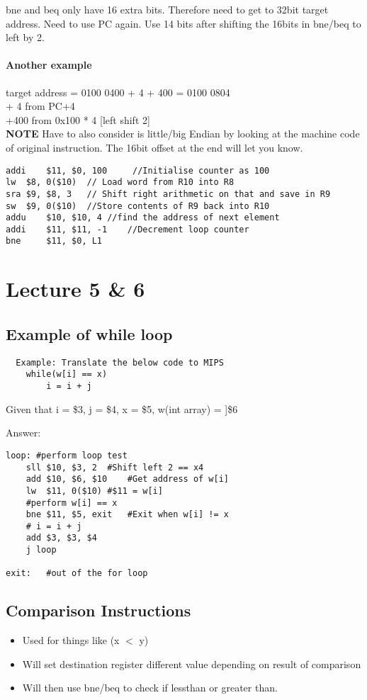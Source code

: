 \documentclass{article}
\begin{document}
	bne and beq only have 16 extra bits. Therefore need to get to 32bit target address. Need to use PC again. Use 14 bits after shifting the 16bits in bne/beq to left by 2.

	\paragraph{Another example}
	target address = 0100 0400 + 4  + 400 = 0100 0804 \\
	+ 4 from PC+4 \\
	+400 from 0x100 * 4 [left shift 2] \\
	\textbf{NOTE} Have to also consider is little/big Endian by looking at the machine code of original instruction. The 16bit offset at the end will let you know.

	\begin{lstlisting}
addi 	$11, $0, 100	 //Initialise counter as 100
lw 	$8, 0($10)	// Load word from R10 into R8
sra	$9, $8, 3	// Shift right arithmetic on that and save in R9
sw 	$9, 0($10)	//Store contents of R9 back into R10
addu 	$10, $10, 4	//find the address of next element
addi 	$11, $11, -1	//Decrement loop counter
bne 	$11, $0, L1
	\end{lstlisting}

\section*{Lecture 5 \& 6}
	\subsection*{Example of while loop}
	\begin{lstlisting}
  Example: Translate the below code to MIPS
	while(w[i] == x)
		i = i + j
	\end{lstlisting}

	Given that i = \$3, j = \$4, x = \$5, w(int array) = ]\$6

	Answer:
	\begin{lstlisting}
loop: #perform loop test
	sll	$10, $3, 2	#Shift left 2 == x4
	add $10, $6, $10	#Get address of w[i]
	lw	$11, 0($10)	#$11 = w[i]
	#perform w[i] == x
	bne $11, $5, exit	#Exit when w[i] != x
	# i = i + j
	add $3, $3, $4
	j loop

exit:	#out of the for loop
	\end{lstlisting}

	\subsection*{Comparison Instructions}
	\begin{itemize}
		\item Used for things like (x $<$ y)
		\item Will set destination register different value depending on result of comparison
		\item Will then use bne/beq to check if lessthan or greater than.
	\end{itemize}
\end{document}
